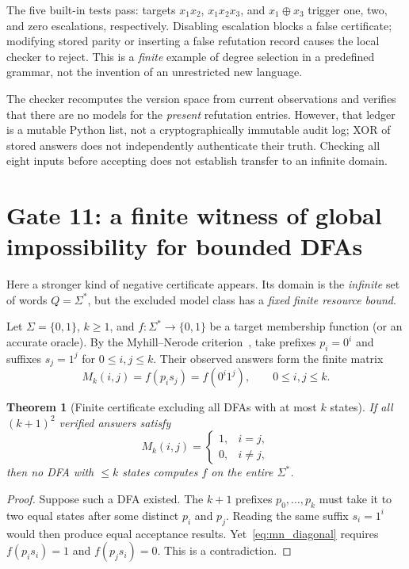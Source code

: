 \documentclass[11pt,a4paper]{article}
\newtheorem{theorem}{Theorem}[section]
\begin{document}
The five built-in tests pass: targets $x_1x_2$, $x_1x_2x_3$, and $x_1\oplus x_3$ trigger one, two, and zero escalations, respectively. Disabling escalation blocks a false certificate; modifying stored parity or inserting a false refutation record causes the local checker to reject. This is a \emph{finite} example of degree selection in a predefined grammar, not the invention of an unrestricted new language.

The checker recomputes the version space from current observations and verifies that there are no models for the \emph{present} refutation entries. However, that ledger is a mutable Python list, not a cryptographically immutable audit log; XOR of stored answers does not independently authenticate their truth. Checking all eight inputs before accepting does not establish transfer to an infinite domain.

\section{Gate 11: a finite witness of global impossibility for bounded DFAs}

Here a stronger kind of negative certificate appears. Its domain is the \emph{infinite} set of words $Q=\Sigma^*$, but the excluded model class has a \emph{fixed finite resource bound}.

Let $\Sigma=\{0,1\}$, $k\ge1$, and $f:\Sigma^*\to\{0,1\}$ be a target membership function (or an accurate oracle). By the Myhill--Nerode criterion~\cite{myhill1957,nerode1958}, take prefixes $p_i=0^i$ and suffixes $s_j=1^j$ for $0\le i,j\le k$. Their observed answers form the finite matrix
\begin{equation}\label{eq:mn_matrix}
M_k(i,j)=f(p_is_j)=f(0^i1^j),\qquad 0\le i,j\le k.
\end{equation}
\begin{theorem}[Finite certificate excluding all DFAs with at most $k$ states]\label{thm:bounded_dfa}
If all $(k+1)^2$ verified answers satisfy
\begin{equation}\label{eq:mn_diagonal}
M_k(i,j)=\begin{cases}1,&i=j,\\0,&i\ne j,\end{cases}
\end{equation}
then \emph{no} DFA with $\le k$ states computes $f$ on the entire $\Sigma^*$.
\end{theorem}
\begin{proof}
Suppose such a DFA existed. The $k+1$ prefixes $p_0,\ldots,p_k$ must take it to two equal states after some distinct $p_i$ and $p_j$. Reading the same suffix $s_i=1^i$ would then produce equal acceptance results. Yet~\eqref{eq:mn_diagonal} requires $f(p_is_i)=1$ and $f(p_js_i)=0$. This is a contradiction.
\end{proof}
\end{document}
